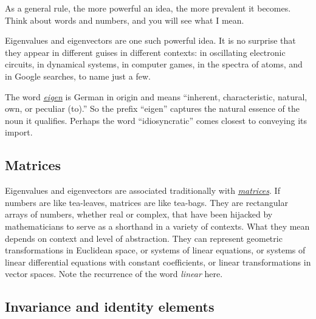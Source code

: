\documentclass[
  12pt,
  a4paper,
]{article}
\begin{document}
As a general rule, the more powerful an idea, the more prevalent it
becomes. Think about words and numbers, and you will see what I mean.

Eigenvalues and eigenvectors are one such powerful idea. It is no
surprise that they appear in different guises in different contexts: in
oscillating electronic circuits, in dynamical systems, in computer
games, in the spectra of atoms, and in Google searches, to name just a
few.

The word
\href{https://en.wikipedia.org/wiki/Talk:Eigenvector}{\emph{eigen}} is
German in origin and means ``inherent, characteristic, natural, own, or
peculiar (to).'' So the prefix ``eigen'' captures the natural essence of
the noun it qualifies. Perhaps the word ``idiosyncratic'' comes closest
to conveying its import.

\hypertarget{matrices}{%
\subsection{Matrices}\label{matrices}}

Eigenvalues and eigenvectors are associated traditionally with
\href{https://en.wikipedia.org/wiki/Matrix_\%28mathematics\%29}{\emph{matrices}}.
If numbers are like tea-leaves, matrices are like tea-bags. They are
rectangular arrays of numbers, whether real or complex, that have been
hijacked by mathematicians to serve as a shorthand in a variety of
contexts. What they mean depends on context and level of abstraction.
They can represent geometric transformations in Euclidean space, or
systems of linear equations, or systems of linear differential equations
with constant coefficients, or linear transformations in vector spaces.
Note the recurrence of the word \emph{linear} here.

\hypertarget{invariance-and-identity-elements}{%
\subsection{Invariance and identity
elements}\label{invariance-and-identity-elements}}
\end{document}
